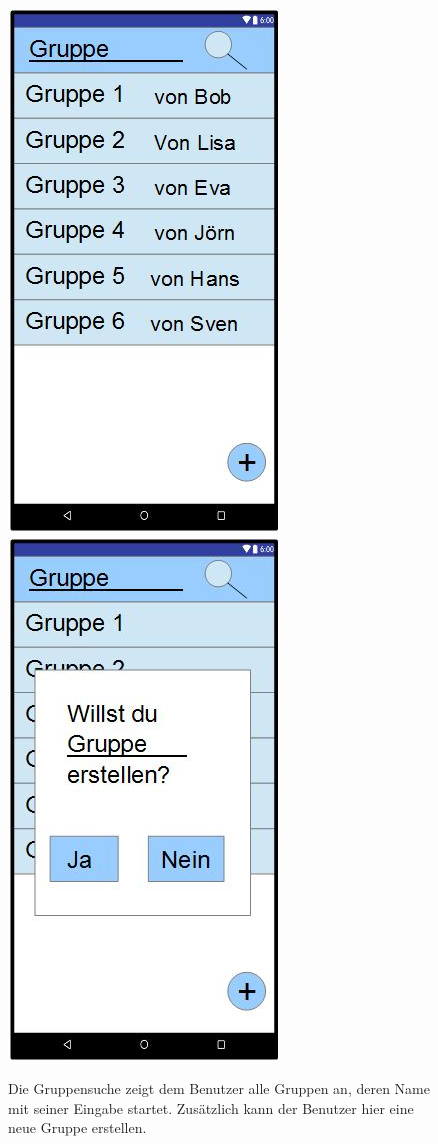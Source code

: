 \documentclass{scrartcl}
\begin{document}
	\newpage
	\begin{figure}[h]
		\includegraphics[width=.5\textwidth]{GUI_NeueGruppe.jpg}
		\includegraphics[width=.5\textwidth]{GUI_GruppeNeuBest.jpg}
		\caption{Die Gruppensuche zeigt dem Benutzer alle Gruppen an, deren Name mit seiner Eingabe startet. Zusätzlich kann der Benutzer hier eine neue Gruppe erstellen.}
	\end{figure}
	
\end{document}
